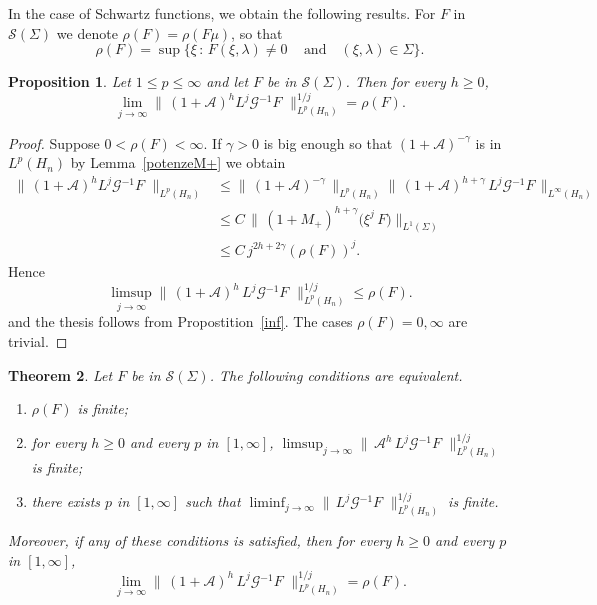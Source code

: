 \documentclass[12pt,a4paper]{amsart}
\theoremstyle{plain}
\newtheorem{theorem}{Theorem}[section]
\newtheorem{proposition}[theorem]{Proposition}
\theoremstyle{definition}
\numberwithin{equation}{section}
\begin{document}
In the case of Schwartz functions, we obtain the following results. 
For $F$ in ${\mathcal S}({\Sigma})$ we denote ${\rho}(F)={\rho}(F\mu)$, so that
$$
{\rho}(F)=\sup\{\xi\, :\,F(\xi,{\lambda})\not= 0\,\quad\text{and}\quad (\xi,{\lambda})\in {\Sigma}\}.
$$
 
 \begin{proposition}\label{liminvsch}
  Let $1\leq p\leq \infty$ and let $F$ be in ${\mathcal S}({\Sigma})$. 
  Then for every $h\geq 0$,
 $$
 \lim_{j\to\infty} 
\|\, \left(1+{\mathcal A} \right)^{h} L^j {\mathcal G}{^{-1}} F\,\,\|_{L^p({{H_{n}}})}^{1/j}
= {\rho}(F).
 $$
\end{proposition}

 \begin{proof} Suppose $0<{\rho}(F)<\infty$.
 If $\gamma>0$ is big enough so that 
 $ \left(1+{\mathcal A} \right)^{-\gamma}$ is in $L^p({{H_{n}}})$ by Lemma~\ref{potenzeM+}  we obtain
   \begin{align*}
  \|\,\left(1+{\mathcal A} \right)^{h} L^j {\mathcal G}{^{-1}} F\,\,\|_{L^p({{H_{n}}})}
  & \leq 
   \|\, \left(1+{\mathcal A} \right)^{-\gamma}\,\|_{L^p({{H_{n}}})}
   \|\, \left(1+{\mathcal A} \right)^{h+ \gamma}\,L^j {\mathcal G}{^{-1}} F\,\|_{L^\infty({{H_{n}}})}
    \\
   & \leq  C\,
    \|\,  \left(1+M_+ \right)^{h+ \gamma}\big( \xi^j\, F\big)\|_{L^1({\Sigma})}
\\
   & \leq
      C\, j^{2h+2 \gamma}\left({\rho}(F)\right)^j.
\end{align*}
Hence 
$$
 \limsup_{j\to\infty} 
\|\, \left(1+{\mathcal A} \right)^{h}\, L^j {\mathcal G}{^{-1}} F\,\,\|_{L^p({{H_{n}}})}^{1/j}
\leq {\rho}(F).
 $$
 and the thesis follows from Propostition~\ref{inf}.
  The cases ${\rho}(F)=0,\infty$ are trivial. 
 \end{proof}
  
  
  
\begin{theorem}\label{schinv}
Let $F$ be in ${\mathcal S}({\Sigma})$. The following conditions are equivalent.
\begin{enumerate}

\item  $\rho(F)$ is finite;

\item  for every $h\geq 0$ and every $p$ in $[1,\infty]$,
 $\limsup_{j\to\infty} 
\|\,{\mathcal A}^h\,L^j{\mathcal G}{^{-1}} F\,\,\|_{L^p({{H_{n}}})}^{1/j}
$ is finite;

\item  there exists  $p$ in $[1,\infty]$ such that
 $\liminf_{j\to\infty} 
\|\,L^j{\mathcal G}{^{-1}} F\,\,\|_{L^p({{H_{n}}})}^{1/j}
$ is finite.

\end{enumerate}
Moreover, if any of these conditions is satisfied, then for every $h\geq 0$ and every $p$ in $[1,\infty]$,
$$
\lim_{j\to\infty} 
\|\, \left(1+{\mathcal A} \right)^{h}\, L^j {\mathcal G}{^{-1}} F\,\,\|_{L^p({{H_{n}}})}^{1/j}
= {\rho}(F).
$$
\end{theorem}
\end{document}
